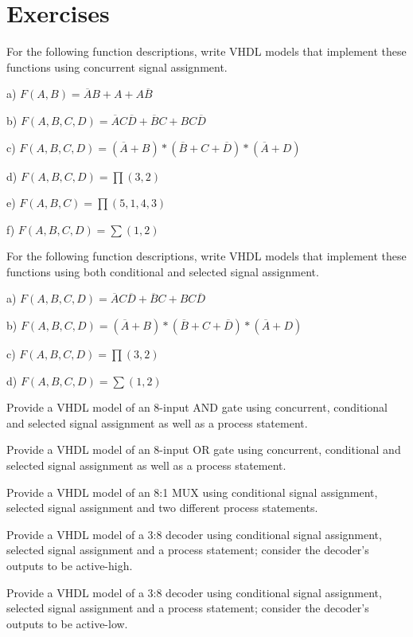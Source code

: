 \section{Exercises}
\begin{my_num_list}
\item For the following function descriptions, write VHDL models that implement these functions using concurrent signal assignment.

a) $F(A,B) =\overline{A}B +A +A\overline{B}$

b) $F(A,B,C,D) =\overline{A}C\overline{D} +\overline{B}C +BC\overline{D}$

c) $F(A,B,C,D) =(\overline{A}+B)*(\overline{B}+C+\overline{D})*(\overline{A}+D)$

d) $F(A,B,C,D) = \displaystyle\prod(3,2) $

e) $F(A,B,C) = \displaystyle\prod(5,1,4,3) $

f) $F(A,B,C,D) = \displaystyle\sum(1,2) $

\item For the following function descriptions, write VHDL models that implement these functions using both conditional and selected signal assignment.

a) $F(A,B,C,D) =\overline{A}C\overline{D} +\overline{B}C +BC\overline{D}$

b) $F(A,B,C,D) =(\overline{A}+B)*(\overline{B}+C+\overline{D})*(\overline{A}+D)$

c) $F(A,B,C,D) = \displaystyle\prod(3,2) $

d) $F(A,B,C,D) = \displaystyle\sum(1,2) $

\item Provide a VHDL model of an 8-input AND gate using concurrent, conditional and selected signal assignment as well as a process statement.
\item Provide a VHDL model of an 8-input OR gate using concurrent, conditional and selected signal assignment as well as a process statement.
\item Provide a VHDL model of an 8:1 MUX using conditional signal assignment, selected signal assignment and two different process statements.
\item Provide a VHDL model of a 3:8 decoder using conditional signal assignment, selected signal assignment and a process statement; consider the decoder’s outputs to be active-high.
\item Provide a VHDL model of a 3:8 decoder using conditional signal assignment, selected signal assignment and a process statement; consider the decoder’s outputs to be active-low.
\end{my_num_list}

